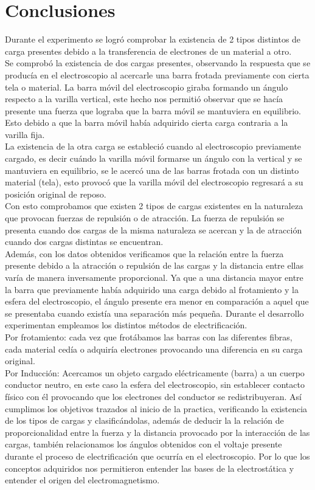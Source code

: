 \documentclass[10pt,journal]{IEEEtran}
\begin{document}
\section{Conclusiones}
Durante el experimento se logró comprobar la existencia de 2 tipos distintos de carga presentes debido a la transferencia de electrones de un material a otro.\\
Se comprobó la existencia de dos cargas presentes, observando la respuesta que se producía en el electroscopio  al acercarle una barra frotada previamente con cierta tela o material.
La barra móvil del electroscopio giraba formando un ángulo respecto a la varilla vertical, este hecho nos permitió observar que se hacía presente una fuerza que lograba que la barra móvil se mantuviera en equilibrio. Esto debido a que la barra móvil había adquirido cierta carga contraria a la varilla fija.\\
La existencia de la otra carga se estableció cuando al electroscopio previamente cargado, es decir cuándo  la varilla móvil formarse un ángulo con la vertical y se mantuviera en equilibrio, se le acercó una de las barras frotada con un distinto material (tela), esto provocó que la varilla móvil del electroscopio regresará a su posición original de reposo.\\
Con esto comprobamos que existen 2 tipos de cargas existentes en la naturaleza que provocan fuerzas de repulsión o de atracción. La fuerza de repulsión se presenta cuando dos cargas de la misma naturaleza se acercan y la de atracción cuando dos cargas distintas se encuentran.\\
Además, con los datos obtenidos verificamos que la relación entre la fuerza presente debido a la atracción o repulsión de las cargas y la distancia entre ellas varía de manera inversamente proporcional. Ya que a una distancia mayor entre la barra que previamente había adquirido una carga debido al frotamiento y la esfera del electroscopio, el ángulo presente era menor en comparación a aquel que se presentaba cuando existía una separación más pequeña.
Durante el desarrollo experimentan empleamos los distintos métodos de electrificación.\\
Por frotamiento: cada vez que frotábamos las barras con las diferentes fibras, cada material cedía o adquiría electrones provocando una diferencia en su carga original.\\
Por Inducción:  Acercamos un objeto cargado eléctricamente (barra) a un cuerpo conductor neutro, en este caso la esfera del electroscopio, sin establecer contacto físico con él provocando que los electrones del conductor se redistribuyeran. Así  cumplimos los objetivos trazados al inicio de la practica, verificando la existencia de los tipos de cargas y clasificándolas, además de deducir la la relación de proporcionalidad entre la fuerza y la distancia provocado por la interacción de las cargas, también relacionamos los ángulos obtenidos con el voltaje presente durante el proceso de electrificación que ocurría en el electroscopio.
Por lo que los conceptos adquiridos nos permitieron entender las bases de la electrostática y entender el origen del electromagnetismo.


\end{document}
